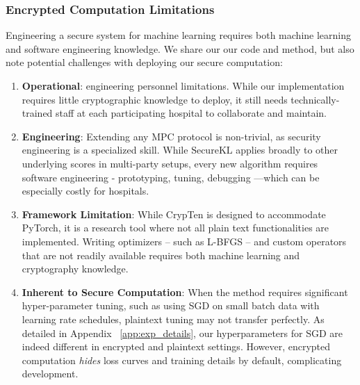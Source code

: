 \subsubsection{Encrypted Computation Limitations}
\label{sec:eng-limits}
Engineering a secure system for machine learning requires both machine learning and software engineering knowledge. We share our our code and method, but also note potential challenges with deploying our secure computation:
\begin{enumerate}
    \item \textbf{Operational}: engineering personnel limitations. While our implementation requires little cryptographic knowledge to deploy, it still needs technically-trained staff at each participating hospital to collaborate and maintain.
    \item \textbf{Engineering}: Extending any MPC protocol is non-trivial, as security engineering is a specialized skill. While $\mathrm{SecureKL}$ applies broadly to other underlying scores in multi-party setups, every new algorithm requires software engineering - prototyping, tuning, debugging ---which can be especially costly for hospitals.
    \item \textbf{Framework Limitation}: While CrypTen is designed to accommodate PyTorch, it is a research tool where not all plain text functionalities are implemented. Writing optimizers -- such as L-BFGS --  and custom operators that are not readily available requires both machine learning and cryptography knowledge. %
    \item \textbf{Inherent to Secure Computation}: When the method requires significant hyper-parameter tuning, such as using SGD on small batch data with learning rate schedules, plaintext tuning may not transfer perfectly. As detailed in Appendix ~\ref{app:exp_details}, our hyperparameters for SGD are indeed different in encrypted and plaintext settings. However, encrypted computation \emph{hides} loss curves and training details by default, complicating development.
\end{enumerate}
